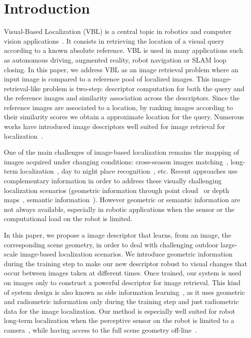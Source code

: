 \section{Introduction}
\label{sec:intro}

Visual-Based Localization (VBL) is a central topic in robotics and computer vision applications~\cite{Piasco2017}. It consists in retrieving the location of a visual query according to a known absolute reference. VBL is used in many applications such as autonomous driving, augmented reality, robot navigation or SLAM loop closing. In this paper, we address VBL as an image retrieval problem where an input image is compared to a reference pool of localized images. This image-retrieval-like problem is two-step: descriptor computation for both the query and the reference images and similarity association across the descriptors. Since the reference images are associated to a location, by ranking images according to their similarity scores we obtain a approximate location for the query. Numerous works have introduced image descriptors well suited for image retrieval for localization~\cite{Arandjelovic2017,Kim2017a,Gordo2017,Radenovic2017,Liu2018}. 

One of the main challenges of image-based localization remains the mapping of images acquired under changing conditions: cross-season images matching~\cite{Naseer2017a}, long-term localization~\cite{Toft2018}, day to night place recognition~\cite{Torii2015}, etc. Recent approaches use complementary information in order to address these visually challenging localization scenarios (geometric information through point cloud~\cite{Sattler2018,Schonberger2018} or depth maps~\cite{Christie2016}, semantic information~\cite{Ardeshir2014,Christie2016,Naseer2017a}). However geometric or semantic information are not always available, especially in robotic applications when the sensor or the computational load on the robot is limited.

In this paper, we propose a image descriptor that learns, from an image, the corresponding scene geometry, in order to deal with challenging outdoor large-scale image-based localization scenarios. We introduce geometric information during the training step to make our new descriptor robust to visual changes that occur between images taken at different times. Once trained, our system is used on images only to construct a powerful descriptor for image retrieval. This kind of system design is also known as side information learning~\cite{Hoffman2016}, as it uses geometric and radiometric information only during the training step and just radiometric data for the image localization. Our method is especially well suited for robot long-term localization when the perceptive sensor on the robot is limited to a camera~\cite{Middelberg2014}, while having access to the full scene geometry off-line~\cite{Paparoditis2012,Maddern2016,Wang2016}. 

